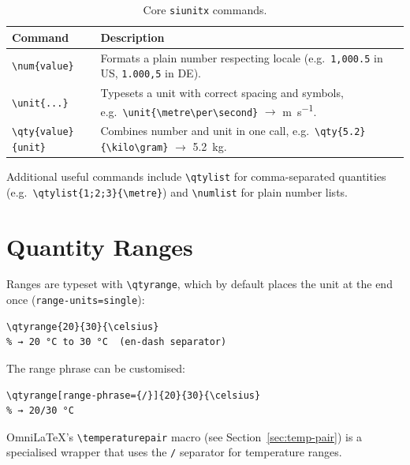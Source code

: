 \begin{table}[htbp]
  \centering
  \caption{Core \texttt{siunitx} commands.}
  \label{tab:siunitx-core}
  \begin{tabular}{@{}lp{}@{}}
    \toprule
    Command & Description \\
    \midrule
    \texttt{\textbackslash num\{value\}} & Formats a plain number
      respecting locale (e.g.\ \texttt{1,000.5} in US,
      \texttt{1.000,5} in DE). \\[4pt]
    \texttt{\textbackslash unit\{...\}} & Typesets a unit with correct
      spacing and symbols, e.g.\
      \texttt{\textbackslash unit\{\textbackslash metre\textbackslash per\textbackslash second\}}
      $\to$ \unit{\metre\per\second}. \\[4pt]
    \texttt{\textbackslash qty\{value\}\{unit\}} & Combines number and unit
      in one call, e.g.\
      \texttt{\textbackslash qty\{5.2\}\{\textbackslash kilo\textbackslash gram\}}
      $\to$ \qty{5.2}{\kilo\gram}. \\
    \bottomrule
  \end{tabular}
\end{table}

Additional useful commands include \texttt{\textbackslash qtylist} for
comma-separated quantities (e.g.\
\texttt{\textbackslash qtylist\{1;2;3\}\{\textbackslash metre\}}) and
\texttt{\textbackslash numlist} for plain number lists.

\section{Quantity Ranges}

Ranges are typeset with \texttt{\textbackslash qtyrange}, which by default
places the unit at the end once (\texttt{range-units=single}):

\begin{verbatim}
\qtyrange{20}{30}{\celsius}
% → 20 °C to 30 °C  (en-dash separator)
\end{verbatim}

The range phrase can be customised:

\begin{verbatim}
\qtyrange[range-phrase={/}]{20}{30}{\celsius}
% → 20/30 °C
\end{verbatim}

OmniLaTeX's \texttt{\textbackslash temperaturepair} macro (see
Section~\ref{sec:temp-pair}) is a specialised wrapper that uses the
\texttt{/} separator for temperature ranges.

